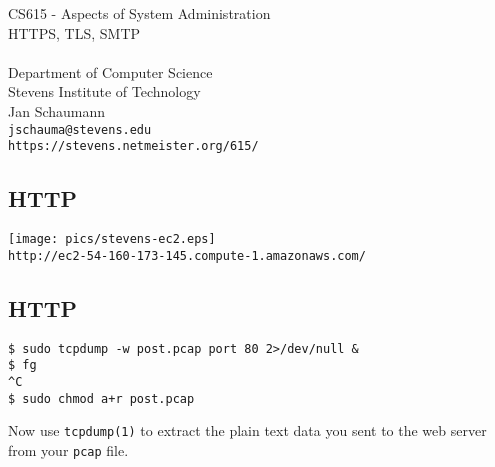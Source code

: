 \documentclass[xga]{xdvislides}
\begin{document}
\setfontphv

\lhead{\slidetitle}                               %
\cfoot{\relax}                               %
\rfoot{\Gray{\today}}

\newcommand{\smallish}{\fontsize{16}{16}\selectfont}

\vspace*{\fill}
\begin{center}
	\Hugesize
		CS615 - Aspects of System Administration\\ [1em]
		HTTPS, TLS, SMTP\\ [1em]
	\hspace*{5mm}\blueline\\ [1em]
	\Normalsize
		Department of Computer Science\\
		Stevens Institute of Technology\\
		Jan Schaumann\\
		\verb+jschauma@stevens.edu+\\
		\verb+https://stevens.netmeister.org/615/+
\end{center}
\vspace*{\fill}


\subsection{HTTP}
\begin{center}
	\texttt{[image: pics/stevens-ec2.eps]} \\
	\verb+http://ec2-54-160-173-145.compute-1.amazonaws.com/+
\end{center}

\subsection{HTTP}
\begin{verbatim}
$ sudo tcpdump -w post.pcap port 80 2>/dev/null &
$ fg
^C
$ sudo chmod a+r post.pcap
\end{verbatim}

Now use {\tt tcpdump(1)} to extract the plain text data you sent
to the web server from your {\tt pcap} file.
\end{document}

